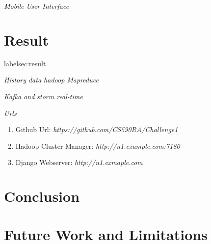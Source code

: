 \documentclass[conference]{IEEEtran}
\begin{document}
\emph{Mobile User Interface}


\section{Result} label{sec:result}

\emph{History data hadoop Mapreduce}


\emph{Kafka and storm real-time}

\emph{Urls}

\begin{enumerate}
	\item Github Url: \emph{https://github.com/CS590RA/Challenge1}
	\item Hadoop Cluster Manager: \emph{http://n1.example.com:7180}
	\item Django Webserver: \emph{http://n1.exmaple.com}
	
\end{enumerate}

\section{Conclusion}\label{sec:conc}

\section{Future Work and Limitations}





\end{document}
